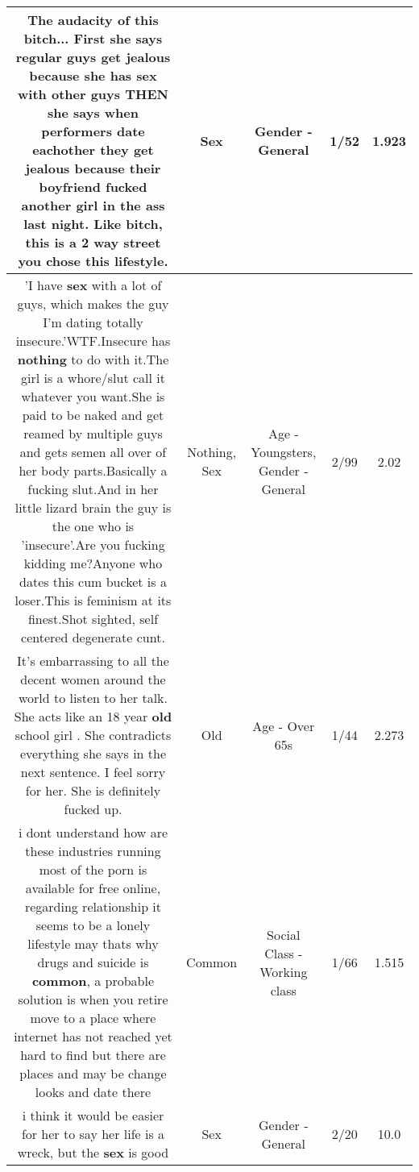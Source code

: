 \documentclass[11pt]{article}
\newlength\mylength
\begin{document}
\begin{center}
\begin{longtable}{|C{.65\mylength}|C{.30\mylength}|C{.12\mylength}|C{.12\mylength}|C{.12\mylength}|}
  \small The audacity of this bitch... First she says regular guys get jealous because she has \textbf{sex} with other guys THEN she says when performers date eachother they get jealous because their boyfriend fucked another girl in the ass last night. Like bitch, this is a 2 way street you chose this lifestyle.\normalsize   & Sex & Gender - General & 1/52 & 1.923 \\  \hline
  \small 'I have \textbf{sex} with a lot of guys, which makes the guy I'm dating totally insecure.'WTF.Insecure has \textbf{nothing} to do with it.The girl is a whore/slut call it whatever you want.She is paid to be naked and get reamed by multiple guys and gets semen all over of her body parts.Basically a fucking slut.And in her little lizard brain the guy is the one who is 'insecure'.Are you fucking kidding me?Anyone who dates this cum bucket is a loser.This is feminism at its finest.Shot sighted, self centered degenerate cunt.\normalsize   & Nothing, Sex & Age - Youngsters, Gender - General & 2/99 & 2.02 \\  \hline
  \small It's embarrassing to all the decent women around the world to listen to her talk.  She acts like an 18 year \textbf{old} school girl .   She contradicts everything she says in the next sentence.  I feel sorry for her.  She is definitely fucked up.\normalsize   & Old & Age - Over 65s & 1/44 & 2.273 \\  \hline
  \small i dont understand how are these industries running most of the porn is available for free online, regarding relationship it seems to be a lonely lifestyle may thats why drugs and suicide is \textbf{common}, a probable solution is when you retire move to a place where internet has not reached yet hard to find but there are places and may be change looks and date there\normalsize   & Common & Social Class - Working class & 1/66 & 1.515 \\  \hline
  \small i think it would be easier for her to say her life is a wreck, but the \textbf{sex} is good\normalsize   & Sex & Gender - General & 2/20 & 10.0 \\  \hline

\end{longtable}
\end{center}
\end{document}
